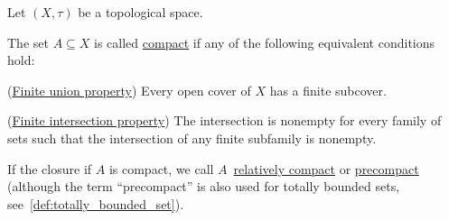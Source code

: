 Let $(X, \tau)$ be a topological space.

\begin{definition}\label{def:compact_set}\cite[40]{Deimling1985}
  The set $A \subseteq X$ is called \uline{compact} if any of the following equivalent conditions hold:
  \begin{defenum}
    \item\label{def:compact_set/union} (\uline{Finite union property}) Every open cover of $X$ has a finite subcover.
    \item\label{def:compact_set/intersection} (\uline{Finite intersection property}) The intersection is nonempty for every family of sets such that the intersection of any finite subfamily is nonempty.
  \end{defenum}

  If the closure if $A$ is compact, we call $A$~\uline{relatively compact} or \uline{precompact} (although the term \enquote{precompact} is also used for totally bounded sets, see~\ref{def:totally_bounded_set}).
\end{definition}
